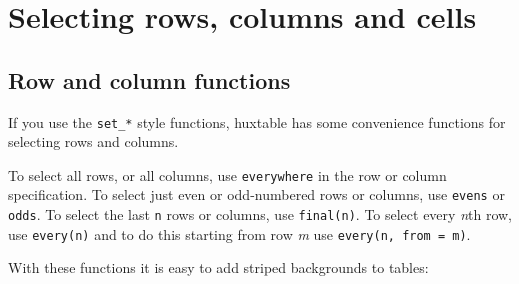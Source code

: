 \documentclass[]{article}
\newenvironment{Shaded}{\begin{snugshade}}{\end{snugshade}}
\newcommand{\DecValTok}[1]{\textcolor[rgb]{0.00,0.00,0.81}{#1}}
\newcommand{\KeywordTok}[1]{\textcolor[rgb]{0.13,0.29,0.53}{\textbf{#1}}}
\newcommand{\NormalTok}[1]{#1}
\newcommand{\OperatorTok}[1]{\textcolor[rgb]{0.81,0.36,0.00}{\textbf{#1}}}
\newcommand{\OtherTok}[1]{\textcolor[rgb]{0.56,0.35,0.01}{#1}}
\newcommand{\StringTok}[1]{\textcolor[rgb]{0.31,0.60,0.02}{#1}}
\begin{document}
\FloatBarrier

\hypertarget{selecting-rows-columns-and-cells}{%
\section{Selecting rows, columns and
cells}\label{selecting-rows-columns-and-cells}}

\hypertarget{row-and-column-functions}{%
\subsection{Row and column functions}\label{row-and-column-functions}}

If you use the \texttt{set\_*} style functions, huxtable has some
convenience functions for selecting rows and columns.

To select all rows, or all columns, use \texttt{everywhere} in the row
or column specification. To select just even or odd-numbered rows or
columns, use \texttt{evens} or \texttt{odds}. To select the last
\texttt{n} rows or columns, use \texttt{final(n)}. To select every
\emph{n}th row, use \texttt{every(n)} and to do this starting from row
\emph{m} use \texttt{every(n,\ from\ =\ m)}.

With these functions it is easy to add striped backgrounds to tables:

\begin{Shaded}
\end{Shaded}
\end{document}
